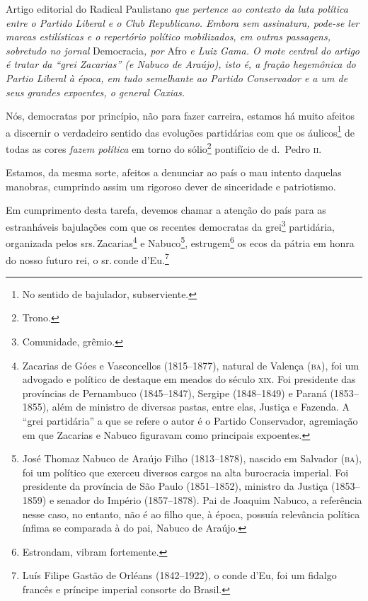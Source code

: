 \begin{didascalia}
Artigo editorial do Radical Paulistano \emph{que pertence ao contexto
da luta política entre o Partido Liberal e o Club Republicano. Embora
sem assinatura, pode-se ler marcas estilísticas e o repertório político
mobilizados, em outras passagens, sobretudo no jornal} Democracia\emph{,
por} Afro \emph{e Luiz Gama. O mote central do artigo é tratar da ``grei
Zacarias'' (e Nabuco de Araújo), isto é, a fração hegemônica do Partio
Liberal à época, em tudo semelhante ao Partido Conservador e a um de
seus grandes expoentes, o general Caxias.}
\end{didascalia}



Nós, democratas por princípio, não para fazer carreira, estamos há muito
afeitos a discernir o verdadeiro sentido das evoluções partidárias com
que os áulicos\footnote{No sentido de bajulador, subserviente.} de
todas as cores \emph{fazem política} em torno do sólio\footnote{Trono.}
pontifício de d.~Pedro \textsc{ii}.

Estamos, da mesma sorte, afeitos a denunciar ao país o mau intento
daquelas manobras, cumprindo assim um rigoroso dever de sinceridade e
patriotismo.

Em cumprimento desta tarefa, devemos chamar a atenção do país para as
estranháveis bajulações com que os recentes democratas da
grei\footnote{Comunidade, grêmio.} partidária, organizada pelos srs.\,Zacarias\footnote{Zacarias de Góes e Vasconcellos (1815--1877), natural
  de Valença (\textsc{ba}), foi um advogado e político de destaque em meados do
  século \textsc{xix}. Foi presidente das províncias de Pernambuco (1845--1847),
  Sergipe (1848--1849) e Paraná (1853--1855), além de ministro de diversas
  pastas, entre elas, Justiça e Fazenda. A ``grei partidária'' a que se
  refere o autor é o Partido Conservador, agremiação em que Zacarias e
  Nabuco figuravam como principais expoentes.} e Nabuco\footnote{José
  Thomaz Nabuco de Araújo Filho (1813--1878), nascido em Salvador (\textsc{ba}),
  foi um político que exerceu diversos cargos na alta burocracia
  imperial. Foi presidente da província de São Paulo (1851--1852),
  ministro da Justiça (1853--1859) e senador do Império (1857--1878). Pai
  de Joaquim Nabuco, a referência nesse caso, no entanto, não é ao filho
  que, à época, possuía relevância política ínfima se comparada à do
  pai, Nabuco de Araújo.}, estrugem\footnote{Estrondam, vibram
  fortemente.} os ecos da pátria em honra do nosso futuro rei, o sr.\,conde d'Eu.\footnote{Luís Filipe Gastão de Orléans (1842--1922), o conde
  d'Eu, foi um fidalgo francês e príncipe imperial consorte do Brasil.}

